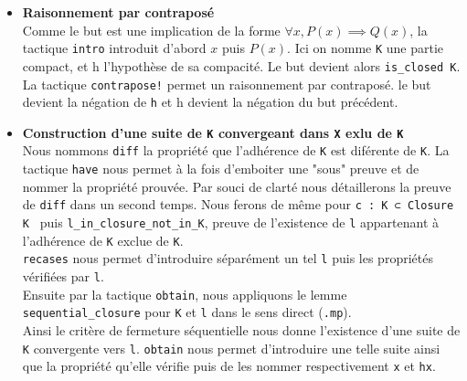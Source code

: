 \documentclass[a4paper, 12pt]{article}
\newcommand{\lean}[1]{\texttt{#1}}
\begin{document}
\begin{itemize}[itemsep=30pt]


    \item \textbf{Raisonnement par contraposé}\\
    Comme le but est une implication de la forme $ \forall x, P(x) \implies Q(x)$, la tactique \lean{intro} introduit d'abord $x$ puis $P(x)$. Ici on nomme \lean{K} une partie compact,
    et h l'hypothèse de sa compacité. Le but devient alors \lean{is_closed K}.\\
    La tactique \lean{contrapose!} permet un raisonnement par contraposé. le but devient la négation de \lean{h} et h devient la négation du but précédent.


    \item \textbf{Construction d'une suite de \lean{K} convergeant dans \lean{X} exlu de \lean{K} }\\
    Nous nommons \lean{diff} la propriété que l'adhérence de \lean{K} est diférente de \lean{K}. La tactique \lean{have} nous permet à la fois d'emboiter une "sous" preuve et de nommer
    la propriété prouvée. Par souci de clarté nous détaillerons la preuve de \lean{diff} dans un second temps. Nous ferons de même pour \lean{c : K ⊂ Closure K } puis
    \lean{l_in_closure_not_in_K}, preuve de l'existence de \lean{l} appartenant à l'adhérence de \lean{K} exclue de \lean{K}.\\
    \lean{recases} nous permet d'introduire séparément un tel \lean{l} puis les propriétés vérifiées par \lean{l}.\\
    Ensuite par la tactique \lean{obtain}, nous appliquons le lemme \lean{sequential_closure} pour \lean{K} et \lean{l} dans le sens direct (\lean{.mp}).\\
    Ainsi le critère de fermeture séquentielle nous donne l'existence d'une suite de \lean{K} convergente vers \lean{l}. \lean{obtain} nous permet d'introduire une telle suite ainsi que
    la propriété qu'elle vérifie puis de les nommer respectivement \lean{x} et \lean{hx}.



\end{itemize}
\end{document}
